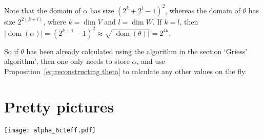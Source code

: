 \documentclass[a4paper,debug]{tufte-handout}
\theoremstyle{plain}
\theoremstyle{definition}
\theoremstyle{remark}
\DeclareMathOperator{\dom}{dom}
\begin{document}
Note that the domain of $\alpha$ has size $(2^k + 2^l - 1)^2$, whereas the domain of $\theta$ has size $2^{2(k+l)}$, where $k=\dim V$ and $l=\dim W$.
If $k=l$, then $|\dom(\alpha)| = (2^{k+1}-1)^2 \approx \sqrt{|\dom(\theta)|} = 2^{4k}$.

So if $\theta$ has been already calculated using the algorithm in the section `Griess' algorithm', then one only needs to store $\alpha$, and use Proposition~\ref{eq:reconstructing theta} to calculate any other values on the fly.

\section{Pretty pictures}

\begin{center}
	\texttt{[image: alpha\_6c1eff.pdf]}
\end{center}



\end{document}
